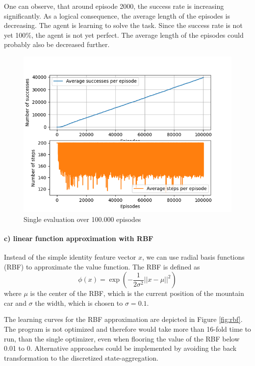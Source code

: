 \documentclass{article}
\begin{document}
One can observe, that around episode 2000, the success rate is increasing significantly. As a logical consequence, the average length of the episodes is decreasing. The agent is learning to solve the task. Since the success rate is not yet 100\%, the agent is not yet perfect. The average length of the episodes could probably also be decreased further. 

\begin{figure}[H]
\centering
\includegraphics[width=0.8 \textwidth]{images/document/repeated_training_investigation_long.png}
\caption{Single evaluation over 100.000 episodes}
\label{fig:}
\end{figure}



\paragraph*{c) linear function approximation with RBF}

Instead of the simple identity feature vector $x$, we can use radial basis functions (RBF) to approximate the value function. The RBF is defined as
\begin{equation}
    \phi(x) = \exp\left(-\frac{1}{2\sigma^2}||x - \mu||^2\right)
\end{equation}
where $\mu$ is the center of the RBF, which is the current position of the mountain car and $\sigma$ the width, which is chosen to $\sigma=0.1$.

The learning curves for the RBF approximation are depicted in Figure \ref{fig:rbf}. The program is not optimized and therefore would take more than 16-fold time to run, than the single optimizer, even when flooring the value of the RBF below 0.01 to 0. Alternative approaches could be implemented by avoiding the back transformation to the discretized state-aggregation.
\end{document}
